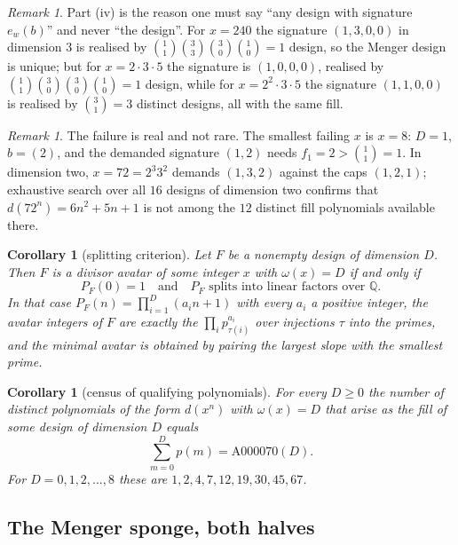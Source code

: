 \documentclass[11pt]{amsart}
\newtheorem{corollary}[theorem]{Corollary}
\theoremstyle{definition}
\theoremstyle{remark}
\newtheorem{remark}[theorem]{Remark}
\begin{document}
\begin{remark}
\label{rem:thedesign}
Part (iv) is the reason one must say ``any design with signature $e_{w}(b)$'' and never ``the design''. For $x=240$ the signature $(1,3,0,0)$ in dimension $3$ is realised by $\binom{1}{1}\binom{3}{3}\binom{3}{0}\binom{1}{0}=1$ design, so the Menger design is unique; but for $x = 2\cdot 3 \cdot 5$ the signature is $(1,0,0,0)$, realised by $\binom{1}{1}\binom{3}{0}\binom{3}{0}\binom{1}{0}=1$ design, while for $x = 2^{2}\cdot 3 \cdot 5$ the signature $(1,1,0,0)$ is realised by $\binom{3}{1}=3$ distinct designs, all with the same fill.
\end{remark}

\begin{remark}
\label{rem:sharp}
The failure is real and not rare. The smallest failing $x$ is $x=8$: $D=1$, $b=(2)$, and the demanded signature $(1,2)$ needs $f_{1}=2 > \binom{1}{1}=1$. In dimension two, $x=72=2^{3}3^{2}$ demands $(1,3,2)$ against the caps $(1,2,1)$; exhaustive search over all $16$ designs of dimension two confirms that $d(72^{n})=6n^{2}+5n+1$ is not among the $12$ distinct fill polynomials available there.
\end{remark}

\begin{corollary}[splitting criterion]
\label{cor:split}
Let $F$ be a nonempty design of dimension $D$. Then $F$ is a divisor avatar of some integer $x$ with $\omega(x)=D$ if and only if
\[
  P_{F}(0) = 1 \quad\text{and}\quad P_{F} \text{ splits into linear factors over } \mathbb{Q}.
\]
In that case $P_{F}(n) = \prod_{i=1}^{D}(a_{i}n+1)$ with every $a_{i}$ a positive integer, the avatar integers of $F$ are exactly the $\prod_{i} p_{\tau(i)}^{a_{i}}$ over injections $\tau$ into the primes, and the minimal avatar is obtained by pairing the largest slope with the smallest prime.
\end{corollary}

\begin{corollary}[census of qualifying polynomials]
\label{cor:census}
For every $D \ge 0$ the number of distinct polynomials of the form $d(x^{n})$ with $\omega(x)=D$ that arise as the fill of some design of dimension $D$ equals
\[
  \sum_{m=0}^{D} p(m) = \mathrm{A000070}(D).
\]
For $D = 0,1,2,\dots,8$ these are $1, 2, 4, 7, 12, 19, 30, 45, 67$.
\end{corollary}

\subsection*{The Menger sponge, both halves}
\end{document}
